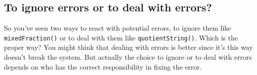 \begin{Shaded}
\begin{Highlighting}[]
\NormalTok{[}\NormalTok{],m:}\NormalTok{[}\NormalTok{]) }\OperatorTok{{-}\textgreater{}}\NormalTok{ [}\NormalTok{]: }
\OperatorTok{=}\NormalTok{ []}
     \NormalTok{(}\NormalTok{,}
        \NormalTok{:}
         \NormalTok{:}
\NormalTok{quotientList([}\NormalTok{,}\NormalTok{,}\NormalTok{,}\NormalTok{,}\NormalTok{,}\NormalTok{],[}\NormalTok{,}\NormalTok{,}\NormalTok{,}\NormalTok{,}\NormalTok{])}
\end{Highlighting}
\end{Shaded}

\begin{Shaded}
\begin{Highlighting}[]
\NormalTok{quotientList([}\NormalTok{,}\NormalTok{,}\NormalTok{,}\NormalTok{,}\NormalTok{,}\NormalTok{],[}\NormalTok{,}\NormalTok{,}\NormalTok{,}\NormalTok{,}\NormalTok{])}
\end{Highlighting}
\end{Shaded}

\subsection{To ignore errors or to deal with
errors?}\label{exceptions.md__to-ignore-errors-or-to-deal-with-errors}

So you've seen two ways to react with potential errors, to ignore them
like \texttt{mixedFraction()} or to deal with them like
\texttt{quotientString()}. Which is the proper way? You might think that
dealing with errors is better since it's this way doesn't break the
system. But actually the choice to ignore or to deal with errors depends
on who has the correct responsibility in fixing the error.

